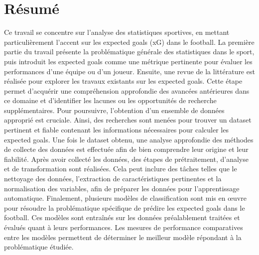 \documentclass[12pt]{article}
\begin{document}
\section{Résumé}
Ce travail se concentre sur l'analyse des statistiques sportives, en mettant particulièrement l'accent sur les expected goals (xG) dans le football. La première partie du travail présente la problématique générale des statistiques dans le sport, puis introduit les expected goals comme une métrique pertinente pour évaluer les performances d'une équipe ou d'un joueur.
\newline\newline
Ensuite, une revue de la littérature est réalisée pour explorer les travaux existants sur les expected goals. Cette étape permet d'acquérir une compréhension approfondie des avancées antérieures dans ce domaine et d'identifier les lacunes ou les opportunités de recherche supplémentaires.
\newline\newline
Pour poursuivre, l'obtention d'un ensemble de données approprié est cruciale. Ainsi, des recherches sont menées pour trouver un dataset pertinent et fiable contenant les informations nécessaires pour calculer les expected goals. Une fois le dataset obtenu, une analyse approfondie des méthodes de collecte des données est effectuée afin de bien comprendre leur origine et leur fiabilité.
\newline\newline
Après avoir collecté les données, des étapes de prétraitement, d'analyse et de transformation sont réalisées. Cela peut inclure des tâches telles que le nettoyage des données, l'extraction de caractéristiques pertinentes et la normalisation des variables, afin de préparer les données pour l'apprentissage automatique.
\newline\newline
Finalement, plusieurs modèles de classification sont mis en œuvre pour résoudre la problématique spécifique de prédire les expected goals dans le football. Ces modèles sont entraînés sur les données préalablement traitées et évalués quant à leurs performances. Les mesures de performance comparatives entre les modèles permettent de déterminer le meilleur modèle répondant à la problématique étudiée.


\newpage

\listoftables

\newpage

\listoffigures
\end{document}
